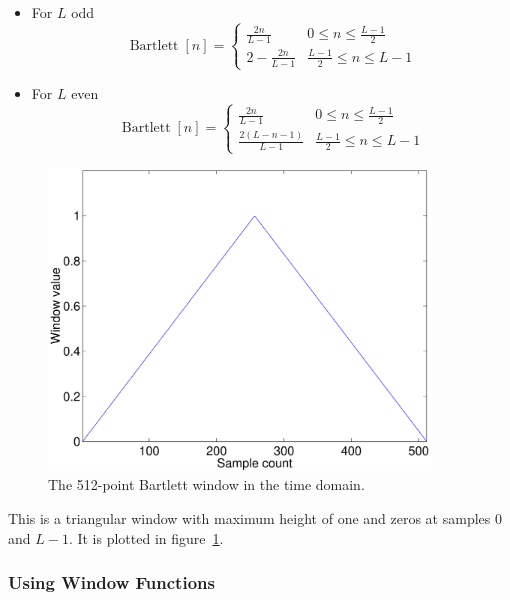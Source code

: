 \begin{itemize}
\item For $L$ odd
\begin{equation}
\operatorname{Bartlett}[n]= \left\{\begin{array}{cl}
                        \frac{2n}{L-1}   & 0\le n \le \frac{L-1}{2} \\
                        2-\frac{2n}{L-1} & \frac{L-1}{2}\le n\le L-1
          \end{array}\right.
\end{equation}

\item For $L$ even
\begin{equation}
\operatorname{Bartlett}[n]= \left\{\begin{array}{cl}
                        \frac{2n}{L-1}       & 0\le n \le \frac{L-1}{2} \\
                        \frac{2(L-n-1)}{L-1} & \frac{L-1}{2}\le n\le L-1
          \end{array}\right.
\end{equation}

\end{itemize}

\begin{figure}
\centerline{\includegraphics[width=4in]{ch-fft/ufft_bartlett_w512}}
\caption{The 512-point Bartlett window in the time
domain.\label{fig:ufft-baw}}
\end{figure}
 
This is a triangular window with maximum height of one and zeros at
samples 0 and $L-1$. It is plotted in figure~\ref{fig:ufft-baw}.

\subsubsection{Using Window Functions}


